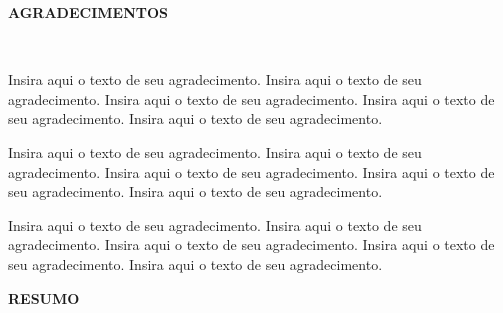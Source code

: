 \documentclass[a4paper,12pt]{report}%
\begin{document}
\addcontentsline{}{}{}

\newpage

%
%

\thispagestyle{empty}

\begin{center}
  {\normalsize \textnormal{\textbf{AGRADECIMENTOS}} }
\end{center}

\hbox{ }

Insira aqui o texto de seu agradecimento. Insira aqui o texto de seu agradecimento. Insira aqui o texto de seu agradecimento. Insira aqui o texto de seu agradecimento. Insira aqui o texto de seu agradecimento.

Insira aqui o texto de seu agradecimento. Insira aqui o texto de seu agradecimento. Insira aqui o texto de seu agradecimento. Insira aqui o texto de seu agradecimento. Insira aqui o texto de seu agradecimento.

Insira aqui o texto de seu agradecimento. Insira aqui o texto de seu agradecimento. Insira aqui o texto de seu agradecimento. Insira aqui o texto de seu agradecimento. Insira aqui o texto de seu agradecimento.






\addcontentsline{}{}{}

\newpage

%
%

\thispagestyle{empty}

\begin{center}
  {\normalsize \textnormal{\textbf{RESUMO}} }
\end{center}
\end{document}
